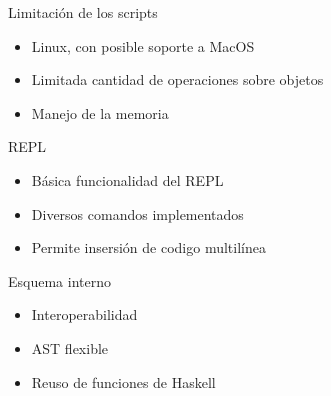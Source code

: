 \begin{frame}
  \begin{center}
    Limitación de los scripts
    \begin{itemize}
      \item Linux, con posible soporte a MacOS
      \item Limitada cantidad de operaciones sobre objetos
      \item Manejo de la memoria
    \end{itemize}
  \end{center}

  \framebreak
  \begin{center}
    REPL
    \begin{itemize}
      \item Básica funcionalidad del REPL
      \item Diversos comandos implementados
      \item Permite insersión de codigo multilínea
    \end{itemize}
  \end{center}

  \framebreak
  \begin{center}
    Esquema interno
    \begin{itemize}
      \item Interoperabilidad
      \item AST flexible
      \item Reuso de funciones de Haskell
    \end{itemize}
  \end{center}
\end{frame}


